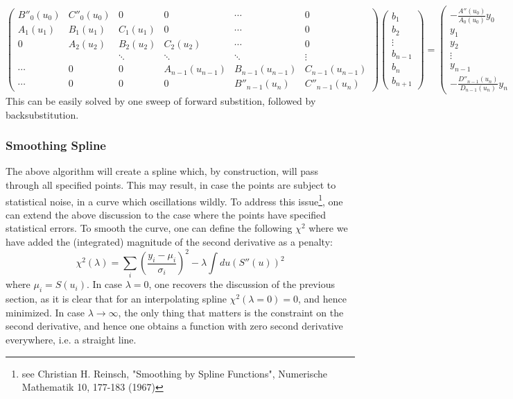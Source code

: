 \documentclass[a4paper,10pt,twosided]{article}
\begin{document}
\begin{equation}
   \left( \begin{array}{ccccccccccccc}  
       B''_0(u_0) & C''_0(u_0)  & 0 & 0  &  \cdots & 0
  \\   A_1(u_1) & B_1(u_1) & C_1(u_1) & 0        &  \cdots & 0 
  \\   0        & A_2(u_2) & B_2(u_2) & C_2(u_2) &  \cdots & 0 
  \\            &          & \ddots   & \ddots   & \ddots   & \vdots
  \\    \cdots & 0 & 0 & A_{n-1}(u_{n-1}) & B_{n-1}(u_{n-1}) & C_{n-1}(u_{n-1})
  \\   \cdots  & 0& 0  & 0 &  B''_{n-1}(u_n) & C''_{n-1}(u_n) 
    \end{array} \right) 
   \left( \begin{array}{c}  b_1 \\ b_2 \\ \vdots \\ b_{n-1} \\ b_n \\ b_{n+1}  \end{array}  \right) 
   = \left( \begin{array}{c} -\frac{A''(u_0)}{A_0(u_0)} y_0  \\ y_1 \\ y_2 \\ \vdots \\ y_{n-1} \\ -\frac{D''_{n-1}(u_n)}{D_{n-1}(u_n)} y_n         \end{array}\right)
\end{equation}
This can be easily solved by one sweep of forward substition, followed by backsubstitution.

\subsubsection{Smoothing Spline}
The above algorithm will create a spline which, by construction, will pass through all specified points.
This may result, in case the points are subject to statistical noise, in a curve which oscillations wildly.
To address this issue\footnote{see Christian H. Reinsch, "Smoothing by Spline Functions", Numerische Mathematik 10, 177-183 (1967)}, one can extend the above discussion to the case where the points have specified
statistical errors. To smooth the curve, one can define the following $\chi^2$ where we have added the
(integrated) magnitude of the second derivative as a penalty:
\begin{equation}
     \chi^2(\lambda) = \sum_i \left( \frac{y_i-\mu_i}{\sigma_i} \right)^2 - \lambda \int du \left( S''(u) \right)^2
\end{equation}
where $\mu_i = S(u_i)$.
In case $\lambda=0$, one recovers the discussion of the previous section, as it is clear that for an
interpolating spline $\chi^2(\lambda=0) = 0$, and hence minimized. In case $\lambda\to\infty$, the
only thing that matters is the constraint on the second derivative, and hence one obtains a function
with zero second derivative everywhere, i.e. a straight line.
\end{document}

